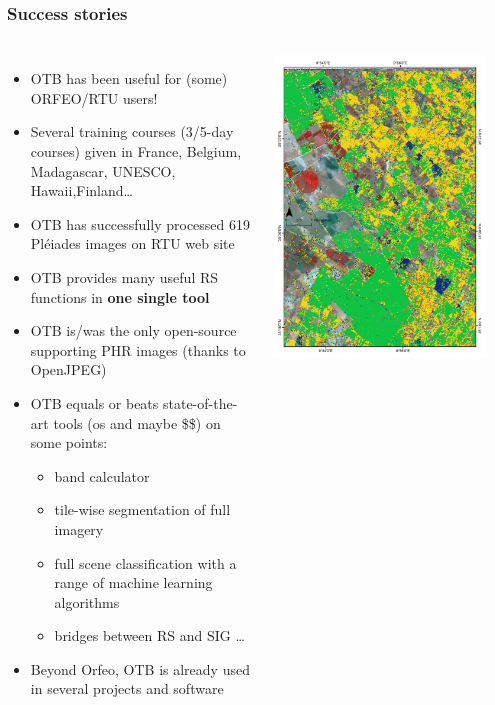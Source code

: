 \documentclass[8pt]{beamer}
\begin{document}
\begin{frame}
\frametitle{Success stories}
\begin{columns}
\begin{itemize}
\item OTB has been useful for (some) ORFEO/RTU users!
\item Several training courses (3/5-day courses) given in France, Belgium,
Madagascar, UNESCO, Hawaii,Finland\ldots
\item OTB has successfully processed 619 Pléiades
  images on RTU web site
\item OTB provides many useful RS functions in \textbf{one single tool}
\item OTB is/was the only open-source supporting PHR images (thanks to OpenJPEG)
\item OTB equals or beats state-of-the-art tools (os and maybe \$\$) on some points: 
  \begin{itemize}
  \item band calculator
  \item tile-wise segmentation of full imagery
  \item full scene classification with a range of machine learning algorithms
  \item bridges between RS and SIG \ldots
  \end{itemize}
\item Beyond Orfeo, OTB is already used in several projects and software
\end{itemize}
\includegraphics[width=0.9\textwidth]{images/resultats_ird.png}\\

\end{columns}
\end{frame}
\end{document}
